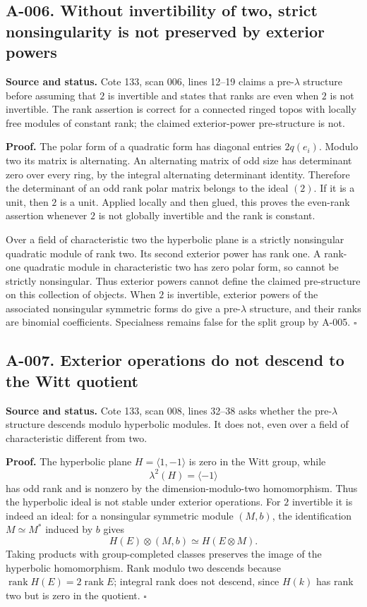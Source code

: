 \documentclass[11pt]{article}
\begin{document}
\subsection*{A-006. Without invertibility of two, strict nonsingularity is not preserved by exterior powers}
\textbf{Source and status.} Cote 133, scan 006, lines 12--19 claims a
pre-$\lambda$ structure before assuming that $2$ is invertible and states
that ranks are even when $2$ is not invertible.  The rank assertion is
correct for a connected ringed topos with locally free modules of
constant rank; the claimed exterior-power pre-structure is not.

\textbf{Proof.} The polar form of a quadratic form has diagonal entries
$2q(e_i)$.  Modulo two its matrix is alternating.  An alternating matrix
of odd size has determinant zero over every ring, by the integral
alternating determinant identity.  Therefore the determinant of an odd
rank polar matrix belongs to the ideal $(2)$.  If it is a unit, then
$2$ is a unit.  Applied locally and then glued, this proves the even-rank
assertion whenever $2$ is not globally invertible and the rank is
constant.

Over a field of characteristic two the hyperbolic plane is a strictly
nonsingular quadratic module of rank two.  Its second exterior power
has rank one.  A rank-one quadratic module in characteristic two has
zero polar form, so cannot be strictly nonsingular.  Thus exterior
powers cannot define the claimed pre-structure on this collection of
objects.  When $2$ is invertible, exterior powers of the associated
nonsingular symmetric forms do give a pre-$\lambda$ structure, and
their ranks are binomial coefficients.  Specialness remains false for
the split group by A-005. \hfill$\square$

\subsection*{A-007. Exterior operations do not descend to the Witt quotient}
\textbf{Source and status.} Cote 133, scan 008, lines 32--38 asks whether
the pre-$\lambda$ structure descends modulo hyperbolic modules.  It does
not, even over a field of characteristic different from two.

\textbf{Proof.} The hyperbolic plane $H=\langle1,-1\rangle$ is zero in
the Witt group, while
\[
 \lambda^2(H)=\langle-1\rangle
\]
has odd rank and is nonzero by the dimension-modulo-two homomorphism.
Thus the hyperbolic ideal is not stable under exterior operations.
For $2$ invertible it is indeed an ideal: for a nonsingular symmetric
module $(M,b)$, the identification $M\simeq M^*$ induced by $b$ gives
\[
 H(E)\otimes(M,b)\simeq H(E\otimes M).
\]
Taking products with group-completed classes preserves the image of
the hyperbolic homomorphism.  Rank modulo two descends because
$\operatorname{rank}H(E)=2\operatorname{rank}E$; integral rank does
not descend, since $H(k)$ has rank two but is zero in the quotient.
\hfill$\square$
\end{document}
